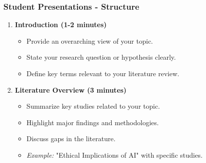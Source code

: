 \documentclass[aspectratio=169]{beamer}
\begin{document}
\begin{frame}[fragile]
    \frametitle{Student Presentations - Structure}
    \begin{enumerate}
        \item \textbf{Introduction (1-2 minutes)}
        \begin{itemize}
            \item Provide an overarching view of your topic.
            \item State your research question or hypothesis clearly.
            \item Define key terms relevant to your literature review.
        \end{itemize}
        
        \item \textbf{Literature Overview (3 minutes)}
        \begin{itemize}
            \item Summarize key studies related to your topic.
            \item Highlight major findings and methodologies.
            \item Discuss gaps in the literature.
            \item \textit{Example:} "Ethical Implications of AI" with specific studies.
        \end{itemize}
    \end{enumerate}
\end{frame}
\end{document}
